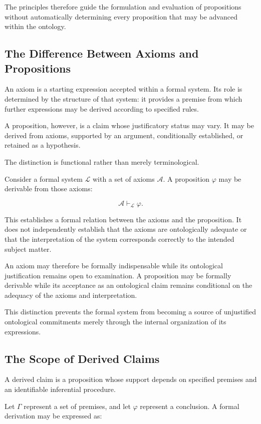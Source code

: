 The principles therefore guide the formulation and evaluation
of propositions without automatically determining every
proposition that may be advanced within the ontology.

\subsection{The Difference Between Axioms and Propositions}

An axiom is a starting expression accepted within a formal
system. Its role is determined by the structure of that system:
it provides a premise from which further expressions may be
derived according to specified rules.

A proposition, however, is a claim whose justificatory status
may vary. It may be derived from axioms, supported by an
argument, conditionally established, or retained as a hypothesis.

The distinction is functional rather than merely terminological.

Consider a formal system \(\mathcal{L}\) with a set of axioms
\(\mathcal{A}\). A proposition \(\varphi\) may be derivable
from those axioms:

\[
    \mathcal{A} \vdash_{\mathcal{L}} \varphi.
\]

This establishes a formal relation between the axioms and
the proposition. It does not independently establish that
the axioms are ontologically adequate or that the interpretation
of the system corresponds correctly to the intended subject
matter.

An axiom may therefore be formally indispensable while its
ontological justification remains open to examination. A
proposition may be formally derivable while its acceptance
as an ontological claim remains conditional on the adequacy
of the axioms and interpretation.

This distinction prevents the formal system from becoming
a source of unjustified ontological commitments merely through
the internal organization of its expressions.

\subsection{The Scope of Derived Claims}

A derived claim is a proposition whose support depends on
specified premises and an identifiable inferential procedure.

Let \(\Gamma\) represent a set of premises, and let
\(\varphi\) represent a conclusion. A formal derivation may
be expressed as:

